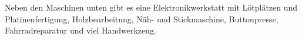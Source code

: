 Neben den Maschinen unten gibt es eine Elektronikwerkstatt mit
Lötplätzen und Platinenfertigung, Holzbearbeitung, Näh- und
Stickmaschine, Buttonpresse, Fahrradreparatur und viel Handwerkzeug.
